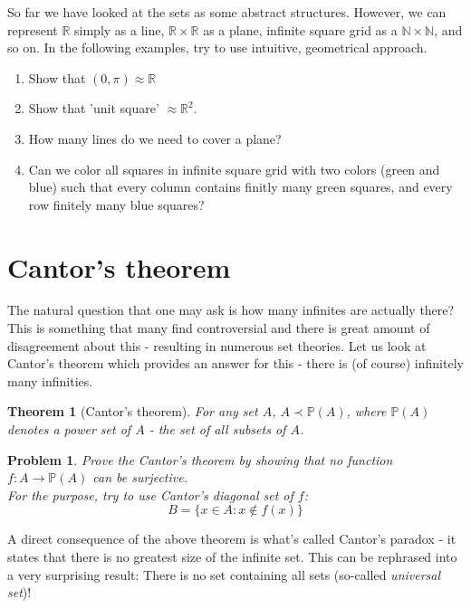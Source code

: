 \documentclass[11pt,a5paper]{article}
\newtheorem{theorem}{Theorem}
\newtheorem{problem}{Problem}
\begin{document}
\noindent So far we have looked at the sets as some abstract structures. However, we can represent $\mathbb{R}$ simply as a line, $\mathbb{R}\times\mathbb{R}$ as a plane, infinite square grid as a $\mathbb{N}\times\mathbb{N}$, and so on. In the following examples, try to use intuitive, geometrical approach.
\begin{enumerate}
  \item Show that $(0,\pi)\approx\mathbb{R}$
  \item Show that 'unit square' $\approx\mathbb{R}^2$.
  \item How many lines do we need to cover a plane?
  \item Can we color all squares in infinite square grid with two colors (green and blue) such that every column contains finitly many green squares, and every row finitely many blue squares?
\end{enumerate}

\section{Cantor's theorem}

The natural question that one may ask is how many infinites are actually there? This is something that many find controversial and there is great amount of disagreement about this - resulting in numerous set theories. 
Let us look at Cantor's theorem which provides an answer for this - there is (of course) infinitely many infinities.

\begin{theorem}[Cantor's theorem]
For any set $A$, $A\prec \mathbb{P}(A)$, where $\mathbb{P}(A)$ denotes a \emph{power set} of $A$ - the set of all subsets of $A$.
\end{theorem}

\begin{problem}
Prove the Cantor's theorem by showing that no function \\ $f: A \rightarrow \mathbb{P}(A)$ can be surjective. \\
For the purpose, try to use \emph{Cantor's diagonal set of $f$}: \[B = \{{x \in A : x \notin f(x)}\}\]
\end{problem}

\noindent A direct consequence of the above theorem is what's called Cantor's paradox - it states that there is no greatest size of the infinite set. This can be rephrased into a very surprising result: There is no set containing all sets (so-called \emph{universal set})!
\end{document}
